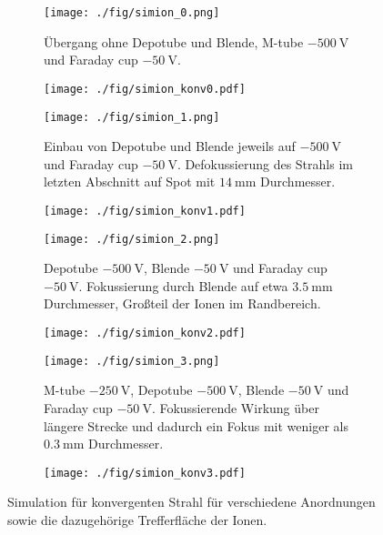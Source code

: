 \begin{figure}
  \begin{subfigure}[h]{0.50\textwidth}
    \texttt{[image: ./fig/simion\_0.png]}
    \caption{Übergang ohne Depotube und Blende, M-tube $\SI{-500}{\volt}$ und Faraday cup $\SI{-50}{\volt}$.}
    \label{fig:konv0}
  \end{subfigure}\hfill
  \begin{subfigure}[h]{0.4\textwidth}
    \texttt{[image: ./fig/simion\_konv0.pdf]}
    \label{fig:konv1}
  \end{subfigure}\hfill
  \begin{subfigure}[h]{0.50\textwidth}
    \texttt{[image: ./fig/simion\_1.png]}
    \caption{Einbau von Depotube und Blende jeweils auf $\SI{-500}{\volt}$ und Faraday cup $\SI{-50}{\volt}$. Defokussierung des Strahls im letzten Abschnitt auf Spot mit $\SI{14}{\mm}$ Durchmesser.}
    \label{fig:konv2}
  \end{subfigure}\hfill
  \begin{subfigure}[h]{0.4\textwidth}
    \texttt{[image: ./fig/simion\_konv1.pdf]}
    \label{fig:konv3}
  \end{subfigure}\hfill
  \begin{subfigure}[h]{0.50\textwidth}
    \texttt{[image: ./fig/simion\_2.png]}
    \caption{Depotube $\SI{-500}{\volt}$, Blende $\SI{-50}{\volt}$ und Faraday cup $\SI{-50}{\volt}$. Fokussierung durch Blende auf etwa $\SI{3,5}{\mm}$ Durchmesser, Großteil der Ionen im Randbereich.}
    \label{fig:konv4}
  \end{subfigure}\hfill
  \begin{subfigure}[h]{0.4\textwidth}
    \texttt{[image: ./fig/simion\_konv2.pdf]}
    \label{fig:konv5}
  \end{subfigure}\hfill
  \begin{subfigure}[h]{0.50\textwidth}
    \texttt{[image: ./fig/simion\_3.png]}
    \caption{M-tube $\SI{-250}{\volt}$, Depotube $\SI{-500}{\volt}$, Blende $\SI{-50}{\volt}$ und Faraday cup $\SI{-50}{\volt}$. Fokussierende Wirkung über längere Strecke und dadurch ein Fokus mit weniger als $\SI{0,3}{\mm}$ Durchmesser.}
    \label{fig:konv6}
  \end{subfigure}\hfill
  \begin{subfigure}[h]{0.4\textwidth}
    \texttt{[image: ./fig/simion\_konv3.pdf]}
    \label{fig:konv7}
  \end{subfigure}
  \caption{Simulation für konvergenten Strahl für verschiedene Anordnungen sowie die dazugehörige Trefferfläche der Ionen.}
  \label{fig:simion_konv}
\end{figure}


